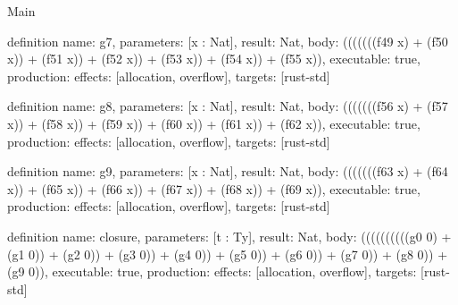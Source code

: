 \begin{lexlean}{Main}
\begin{semanticmodule}
definition{
  name: g7,
  parameters: [x : Nat],
  result: Nat,
  body: (((((((f49 x) + (f50 x)) + (f51 x)) + (f52 x)) + (f53 x)) + (f54 x)) + (f55 x)),
  executable: true,
  production: {effects: [allocation, overflow], targets: [rust-std]}
}

definition{
  name: g8,
  parameters: [x : Nat],
  result: Nat,
  body: (((((((f56 x) + (f57 x)) + (f58 x)) + (f59 x)) + (f60 x)) + (f61 x)) + (f62 x)),
  executable: true,
  production: {effects: [allocation, overflow], targets: [rust-std]}
}

definition{
  name: g9,
  parameters: [x : Nat],
  result: Nat,
  body: (((((((f63 x) + (f64 x)) + (f65 x)) + (f66 x)) + (f67 x)) + (f68 x)) + (f69 x)),
  executable: true,
  production: {effects: [allocation, overflow], targets: [rust-std]}
}

definition{
  name: closure,
  parameters: [t : Ty],
  result: Nat,
  body: ((((((((((g0 0) + (g1 0)) + (g2 0)) + (g3 0)) + (g4 0)) + (g5 0)) + (g6 0)) + (g7 0)) + (g8 0)) + (g9 0)),
  executable: true,
  production: {effects: [allocation, overflow], targets: [rust-std]}
}
\end{semanticmodule}
\end{lexlean}
